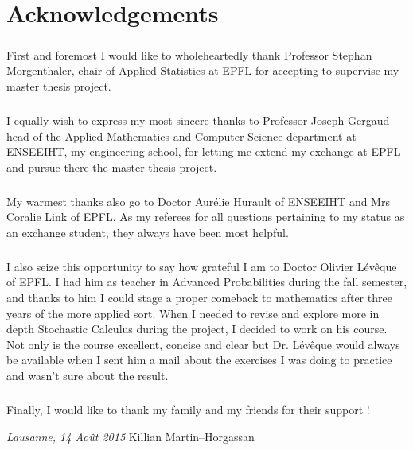 \chapter*{Acknowledgements}

\bigskip
\paragraph{}
First and foremost I would like to wholeheartedly thank Professor Stephan Morgenthaler, chair of Applied Statistics at EPFL for accepting to supervise my master thesis project.
\paragraph{}
I equally wish to express my most sincere thanks to Professor Joseph Gergaud head of the Applied Mathematics and Computer Science department at ENSEEIHT, my engineering school, for letting me extend my exchange at EPFL and pursue there the master thesis project.
\paragraph{}
My warmest thanks also go to Doctor Aurélie Hurault of ENSEEIHT and Mrs Coralie Link of EPFL. As my referees for all questions pertaining to my status as an exchange student, they always have been most helpful.
\paragraph{}
I also seize this opportunity to say how grateful I am to Doctor Olivier Lévêque of EPFL. I had him as teacher in Advanced Probabilities during the fall semester, and thanks to him I could stage a proper comeback to mathematics after three years of the more applied sort. When I needed to revise and explore more in depth Stochastic Calculus during the project, I decided to work on his course. Not only is the course excellent, concise and clear but Dr. Lévêque would always be available when I sent him a mail about the exercises I was doing to practice and wasn't sure about the result.
\paragraph{}
Finally, I would like to thank my family and my friends for their support !
\bigskip
 
\noindent\textit{Lausanne, 14 Ao\^{u}t 2015}
\hfill Killian Martin--Horgassan
